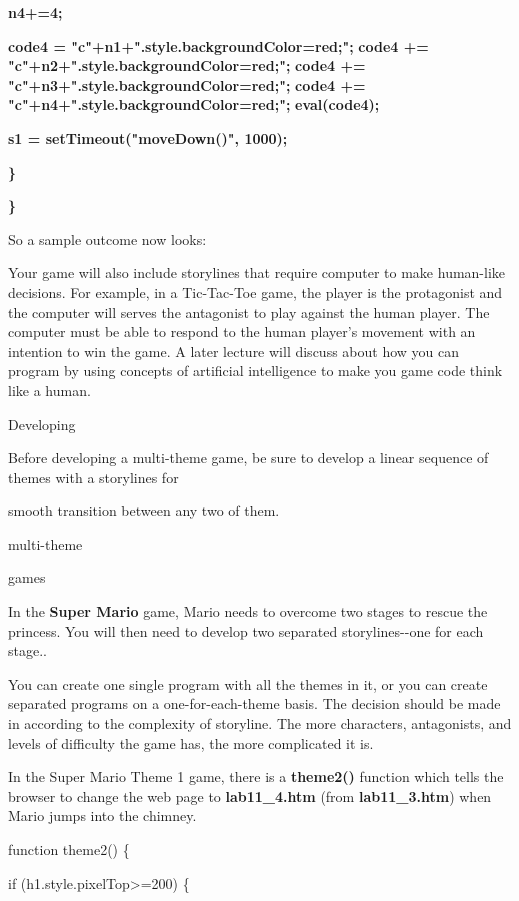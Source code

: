 \documentclass[
]{article}
\begin{document}
\textbf{n4+=4;}

\textbf{}

\textbf{code4 =
"c"+n1+".style.backgroundColor=\textquotesingle red\textquotesingle;";}
\textbf{code4 +=
"c"+n2+".style.backgroundColor=\textquotesingle red\textquotesingle;";}
\textbf{code4 +=
"c"+n3+".style.backgroundColor=\textquotesingle red\textquotesingle;";}
\textbf{code4 +=
"c"+n4+".style.backgroundColor=\textquotesingle red\textquotesingle;";}
\textbf{eval(code4);}

\textbf{s1 = setTimeout("moveDown()", 1000);}

\textbf{\}}

\textbf{\}}

So a sample outcome now looks:

Your game will also include storylines that require computer to make
human-like decisions. For example, in a Tic-Tac-Toe game, the player is
the protagonist and the computer will serves the antagonist to play
against the human player. The computer must be able to respond to the
human player's movement with an intention to win the game. A later
lecture will discuss about how you can program by using concepts of
artificial intelligence to make you game code think like a human.

Developing

Before developing a multi-theme game, be sure to develop a linear
sequence of themes with a storylines for

smooth transition between any two of them.

multi-theme

games

In the \textbf{Super Mario} game, Mario needs to overcome two stages to
rescue the princess. You will then need to develop two separated
storylines-\/-one for each stage..

You can create one single program with all the themes in it, or you can
create separated programs on a one-for-each-theme basis. The decision
should be made in according to the complexity of storyline. The more
characters, antagonists, and levels of difficulty the game has, the more
complicated it is.

In the Super Mario Theme 1 game, there is a \textbf{theme2()} function
which tells the browser to change the web page to \textbf{lab11\_4.htm}
(from \textbf{lab11\_3.htm}) when Mario jumps into the chimney.

function theme2() \{

if (h1.style.pixelTop\textgreater=200) \{
\end{document}

